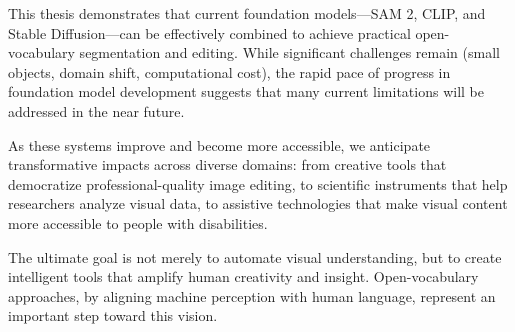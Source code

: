 This thesis demonstrates that current foundation models—SAM 2, CLIP, and Stable Diffusion—can be effectively combined to achieve practical open-vocabulary segmentation and editing. While significant challenges remain (small objects, domain shift, computational cost), the rapid pace of progress in foundation model development suggests that many current limitations will be addressed in the near future.

As these systems improve and become more accessible, we anticipate transformative impacts across diverse domains: from creative tools that democratize professional-quality image editing, to scientific instruments that help researchers analyze visual data, to assistive technologies that make visual content more accessible to people with disabilities.

The ultimate goal is not merely to automate visual understanding, but to create intelligent tools that amplify human creativity and insight. Open-vocabulary approaches, by aligning machine perception with human language, represent an important step toward this vision.
